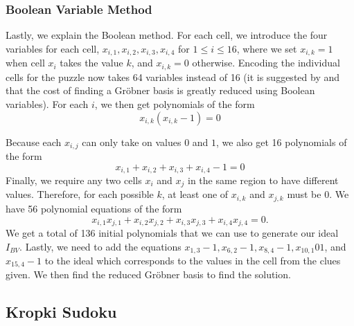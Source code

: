 \documentclass[../main.tex]{subfiles}
\begin{document}
            \subsubsection{Boolean Variable Method}

            Lastly, we explain the Boolean method. For each cell, we introduce the four variables for each cell, $x_{i,1}, x_{i,2}, x_{i,3}, x_{i,4}$ for $1\leq i\leq 16$, where we set $x_{i,k}=1$ when cell $x_i$ takes the value $k$, and $x_{i,k}=0$ otherwise. Encoding the individual cells for the puzzle now takes 64 variables instead of 16 (it is suggested by \citet{bernasconi1997computing} and \citet{sato2008computation} that the cost of finding a Gr\"obner basis is greatly reduced using Boolean variables). For each $i$, we then get polynomials of the form
            \begin{equation} \label{eq:bool}
                x_{i,k}(x_{i,k}-1)=0
            \end{equation}

            Because each $x_{i,j}$ can only take on values $0$ and $1$, we also get 16 polynomials of the form
            \begin{equation} \label{eq:bool sum}
                x_{i,1}+x_{i,2}+x_{i,3}+x_{i,4}-1=0
            \end{equation}
            Finally, we require any two cells $x_i$ and $x_j$ in the same region to have different values. Therefore, for each possible $k$, at least one of $x_{i,k}$ and $x_{j,k}$ must be 0. We have 56 polynomial equations of the form
            \begin{equation} \label{eq:bool prod}
                x_{i,1}x_{j,1} + x_{i,2}x_{j,2} + x_{i,3}x_{j,3} + x_{i,4}x_{j,4} = 0.
            \end{equation}
            We get a total of 136 initial polynomials that we can use to generate our ideal $I_{BV}$. Lastly, we need to add the equations $x_{1,3}-1, x_{6,2}-1, x_{8,4}-1, x_{10, 1}01$, and $x_{15,4}-1$ to the ideal which corresponds to the values in the cell from the clues given. We then find the reduced Gr\"obner basis to find the solution.

        
    \subsection{Kropki Sudoku}
\end{document}

